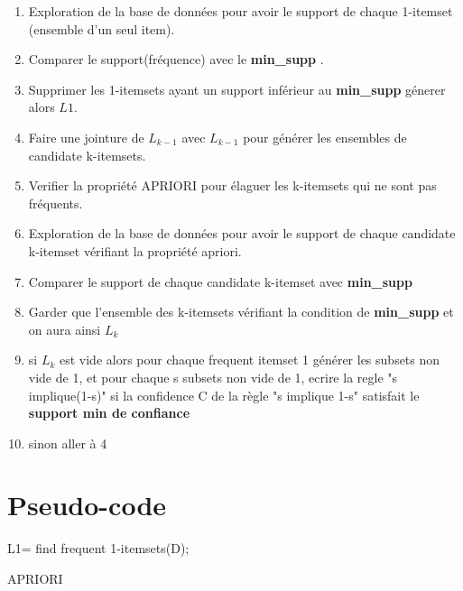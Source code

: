 \documentclass[12pt,a4paper,oneside]{book}
\begin{document}
\begin{enumerate}
	\item Exploration de la base de données pour avoir le support de chaque 1-itemset (ensemble d'un seul item).
	\item Comparer le support(fréquence) avec le\textbf{ min\_supp} .
	\item  Supprimer les 1-itemsets ayant un support inférieur au \textbf{ min\_supp} génerer alors $L1$.
	\item Faire une jointure de $L_{k-1}$ avec $L_{k-1}$  pour générer les ensembles de candidate k-itemsets.
	\item Verifier la propriété APRIORI  pour élaguer les k-itemsets qui ne sont pas fréquents.
	\item Exploration de la base de données pour avoir le support de chaque candidate k-itemset vérifiant la propriété apriori.
	\item Comparer le support de chaque candidate k-itemset avec \textbf{ min\_supp}
	\item Garder que l'ensemble des k-itemsets vérifiant la condition de  \textbf{ min\_supp} et on aura ainsi $L_{k}$
	\item si $L_{k}$ est vide alors pour chaque frequent itemset 1 générer les subsets non vide de 1, et pour chaque s subsets non vide de 1, ecrire la regle "s implique(1-s)" si la confidence C de la règle "s implique 1-s" satisfait le \textbf{support min de confiance }
	\item sinon aller à 4
\end{enumerate}


\newpage

\section{Pseudo-code}



\begin{algorithm}
	\DontPrintSemicolon
	L1= find frequent 1-itemsets(D);
	
	\;
	\caption{{\sc APRIORI}}
	\label{algo:duplicate2}
\end{algorithm}
\end{document}

